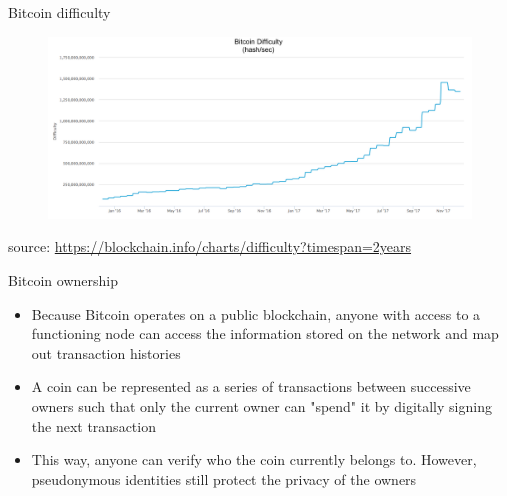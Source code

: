 \documentclass[9pt]{beamer}
\begin{document}

\begin{frame}{Bitcoin difficulty}
	\begin{figure}[]
		\centering
		\includegraphics  [scale=0.2]{Images/difficulty}
	\end{figure}
		\begin{scriptsize}
		source: \href{https://blockchain.info/charts/difficulty?timespan=2years}{https://blockchain.info/charts/difficulty?timespan=2years}
	\end{scriptsize}
\end{frame}


\begin{frame}{Bitcoin ownership}
	\begin{itemize}
		\item Because Bitcoin operates on a public blockchain, anyone with access to a functioning node can access the information stored on the network and map out transaction histories
		\item A coin can be represented as a series of transactions between successive owners such that only the current owner can "spend" it by digitally signing the next transaction
		\item This way, anyone can verify who the coin currently belongs to. However, pseudonymous identities still protect the privacy of the owners
	\end{itemize}
\end{frame}

\end{document}
